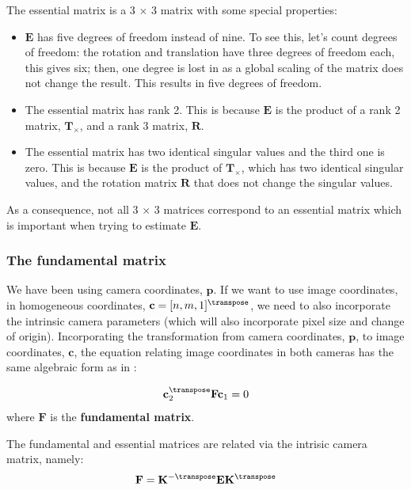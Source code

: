 The essential matrix is a 3 $\times$ 3 matrix with some special properties:
\begin{itemize}
    \item $\mathbf{E}$ has five degrees of freedom instead of nine. To see this, let's count degrees of freedom: the rotation and translation have three degrees of freedom each, this gives six; then, one degree is lost in \eqn{\ref{eq:relation4}} as a global scaling of the matrix does not change the result. This results in five degrees of freedom.

    \item The essential matrix has rank 2. This is because $\mathbf{E}$ is the product of a rank 2 matrix, $\mathbf{T}_{\times}$, and a rank 3 matrix, $\mathbf{R}$.

    \item The essential matrix has two identical singular values and the third one is zero. This is because $\mathbf{E}$ is the product of $\mathbf{T}_{\times}$, which has two identical singular values, and the rotation matrix $\mathbf{R}$ that does not change the singular values.
\end{itemize}
As a consequence, not all 3 $\times$ 3 matrices correspond to an essential matrix which is important when trying to estimate $\mathbf{E}$.


\subsubsection{The fundamental matrix} 
We have been using camera coordinates, $\mathbf{p}$. If we want to use image coordinates, in homogeneous coordinates, $\mathbf{c}=[n,m,1]^\transpose$, we need to also incorporate the intrinsic camera parameters (which will also incorporate pixel size and change of origin). Incorporating the transformation from camera coordinates, $\mathbf{p}$, to image coordinates, $\mathbf{c}$, the equation relating image coordinates in both cameras has the same algebraic form as in \eqn{\ref{eq:relation4}}:

\begin{equation}
    \mathbf{c}_2^\transpose \mathbf{F} \mathbf{c}_1 = 0
\end{equation}
where $\mathbf{F}$ is the {\bf fundamental matrix}.

The fundamental and essential matrices are related via the intrisic camera matrix, namely:
\begin{equation}
    \mathbf{F} = \mathbf{K}^{-\transpose} \mathbf{E} \mathbf{K}^{\transpose}
\end{equation}

